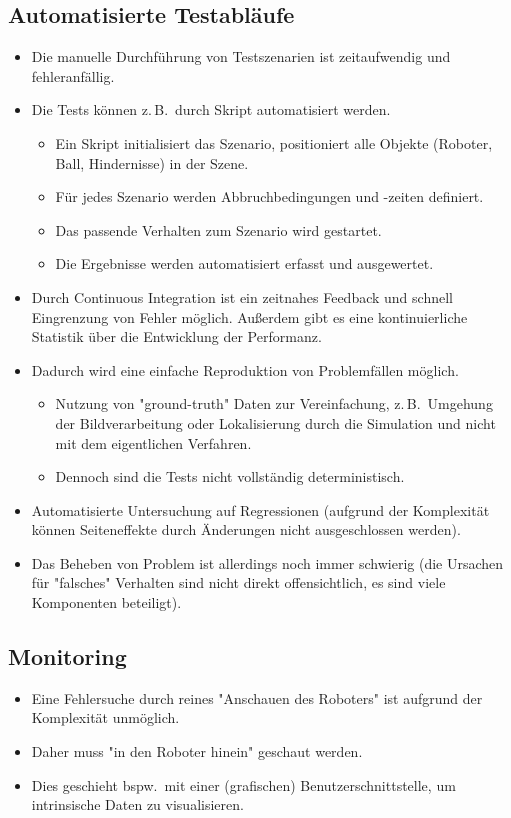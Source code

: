 \documentclass[a4paper, 11pt, accentcolor = tud3b]{tudreport}
\newcommand{\bspw}{bspw.~}
\newcommand{\zB}{z.\,B.~}
\begin{document}
			\subsection{Automatisierte Testabläufe}
				\begin{itemize}
					\item Die manuelle Durchführung von Testszenarien ist zeitaufwendig und fehleranfällig.
					\item Die Tests können \zB durch Skript automatisiert werden.
						\begin{itemize}
							\item Ein Skript initialisiert das Szenario, positioniert alle Objekte (Roboter, Ball, Hindernisse) in der Szene.
							\item Für jedes Szenario werden Abbruchbedingungen und -zeiten definiert.
							\item Das passende Verhalten zum Szenario wird gestartet.
							\item Die Ergebnisse werden automatisiert erfasst und ausgewertet.
						\end{itemize}
					\item Durch Continuous Integration ist ein zeitnahes Feedback und schnell Eingrenzung von Fehler möglich. Außerdem gibt es eine kontinuierliche Statistik über die Entwicklung der Performanz.
					\item Dadurch wird eine einfache Reproduktion von Problemfällen möglich.
						\begin{itemize}
							\item Nutzung von "ground-truth" Daten zur Vereinfachung, \zB Umgehung der Bildverarbeitung oder Lokalisierung durch die Simulation und nicht mit dem eigentlichen Verfahren.
							\item Dennoch sind die Tests nicht vollständig deterministisch.
						\end{itemize}
					\item Automatisierte Untersuchung auf Regressionen (aufgrund der Komplexität können Seiteneffekte durch Änderungen nicht ausgeschlossen werden).
					\item Das Beheben von Problem ist allerdings noch immer schwierig (die Ursachen für "falsches" Verhalten sind nicht direkt offensichtlich, es sind viele Komponenten beteiligt).
				\end{itemize}

			\subsection{Monitoring}
				\begin{itemize}
					\item Eine Fehlersuche durch reines "Anschauen des Roboters" ist aufgrund der Komplexität unmöglich.
					\item Daher muss "in den Roboter hinein" geschaut werden.
					\item Dies geschieht \bspw mit einer (grafischen) Benutzerschnittstelle, um intrinsische Daten zu visualisieren.
				\end{itemize}
\end{document}
